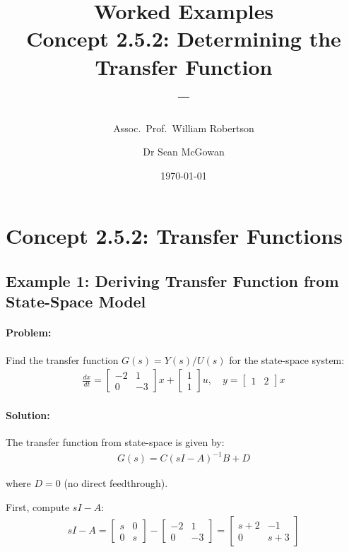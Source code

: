 \documentclass[11pt,a4paper]{article}
\title{\textbf{Worked Examples}\\[0.5em]
\large Concept 2.5.2: Determining the Transfer Function\\[0.3em]
\normalsize \coursesubtitle{} -- \coursetitle}
\author{Assoc.\ Prof.\ William Robertson \and Dr Sean McGowan}
\date{\today}
\begin{document}
\maketitle
\tableofcontents
\newpage

\section{Concept 2.5.2: Transfer Functions}

\subsection{Example 1: Deriving Transfer Function from State-Space Model}

\paragraph{Problem:} Find the transfer function $G(s) = Y(s)/U(s)$ for the state-space system:
\begin{align}
  \frac{dx}{dt} = \begin{bmatrix} -2 & 1 \\ 0 & -3 \end{bmatrix}x + \begin{bmatrix} 1 \\ 1 \end{bmatrix}u, \quad y = \begin{bmatrix} 1 & 2 \end{bmatrix}x
\end{align}

\paragraph{Solution:}

The transfer function from state-space is given by:
\begin{align}
  G(s) = C(sI - A)^{-1}B + D
\end{align}

where $D = 0$ (no direct feedthrough).

First, compute $sI - A$:
\begin{align}
  sI - A = \begin{bmatrix} s & 0 \\ 0 & s \end{bmatrix} - \begin{bmatrix} -2 & 1 \\ 0 & -3 \end{bmatrix} = \begin{bmatrix} s+2 & -1 \\ 0 & s+3 \end{bmatrix}
\end{align}
\end{document}
